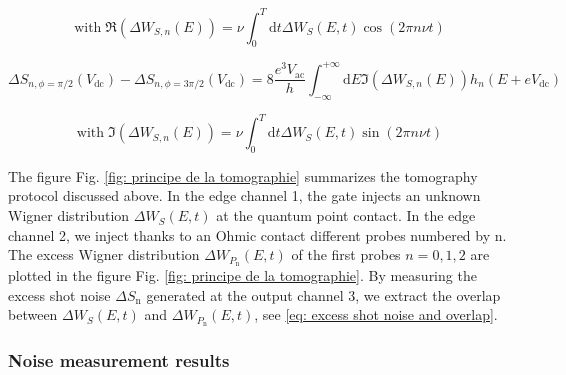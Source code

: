 \begin{equation}
\mathrm{with}\;\Re\left(\Delta W_{S,n}\left(E\right)\right) = \nu\int_{0}^{T}\mathrm{d}t \Delta W_{S}\left(E,t\right)\cos\left(2\pi n \nu t\right) \label{eq: convolution real part tomo Re def}
\end{equation}

\begin{equation}
\Delta S_{n,\phi=\pi/2}\left(V_{\mathrm{dc}}\right)-\Delta S_{n,\phi=3\pi/2}\left(V_{\mathrm{dc}}\right) = 8\frac{e^{3}V_{\mathrm{ac}}}{h}\int_{-\infty}^{+\infty}\mathrm{d}E\Im\left(\Delta W_{S,n}\left(E\right)\right)h_{n}\left(E+eV_{\mathrm{dc}}\right) \label{eq: convolution imag part tomo}
\end{equation}

\begin{equation}
\mathrm{with}\;\Im\left(\Delta W_{S,n}\left(E\right)\right) = \nu\int_{0}^{T}\mathrm{d}t \Delta W_{S}\left(E,t\right)\sin\left(2\pi n \nu t\right) \label{eq: convolution imag part tomo Im def}
\end{equation}

The figure Fig. \ref{fig: principe de la tomographie} summarizes the tomography protocol discussed above.
In the edge channel 1, the gate injects an unknown Wigner distribution $\Delta W_{S}\left(E,t\right)$ at the quantum point contact.
In the edge channel 2, we inject thanks to an Ohmic contact different probes numbered by n.
The excess Wigner distribution $\Delta W_{P_{\mathrm{n}}}\left(E,t\right)$ of the first probes $n = 0, 1, 2$ are plotted in the figure Fig. \ref{fig: principe de la tomographie}.
By measuring the excess shot noise $\Delta S_{\mathrm{n}}$ generated at the output channel 3, we extract the overlap between $\Delta W_{S}\left(E,t\right)$ and $\Delta W_{P_{\mathrm{n}}}\left(E,t\right)$, see \eqref{eq: excess shot noise and overlap}.


\subsubsection*{Noise measurement results}

